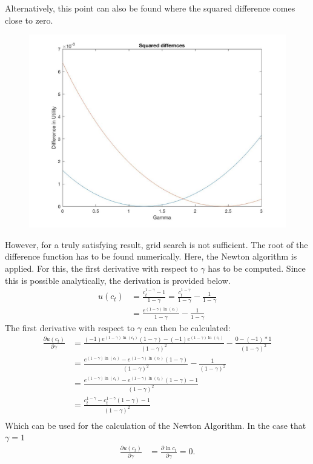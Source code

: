 \documentclass{article}
\begin{document}
Alternatively, this point can also be found where the squared difference comes close to zero. \begin{figure}[h]
\includegraphics[width = \textwidth, keepaspectratio]{PS5Q2Sub3_Squared_Diff.jpg}
\end{figure}
However, for a truly satisfying result, grid search is not sufficient. The root of the difference function has to be found numerically. Here, the Newton algorithm is applied. For this, the first derivative with respect to $\gamma$ has to be computed. Since this is possible analytically, the derivation is provided below.
\begin{align}
u(c_t) &= \frac{c_t^{1-\gamma}-1}{1- \gamma} = \frac{c_t^{1-\gamma}}{1- \gamma} -\frac{1}{1- \gamma}\\
&= \frac{e^{(1-\gamma) \ln (c_t)}}{1- \gamma} -\frac{1}{1- \gamma}
\end{align}
The first derivative with respect to $\gamma$ can then be calculated:
\begin{align}
\frac{ \partial u(c_t)}{\partial \gamma} &= \frac{(-1)e^{(1-\gamma) \ln (c_t)} (1- \gamma)- (-1)e^{(1-\gamma) \ln (c_t)}}{(1- \gamma)^2} - \frac{0 - (-1)*1}{(1- \gamma)^2} \\
&= \frac{e^{(1-\gamma) \ln (c_t)}-e^{(1-\gamma) \ln (c_t)} (1- \gamma)}{(1- \gamma)^2} - \frac{1}{(1- \gamma)^2} \\
&= \frac{e^{(1-\gamma) \ln (c_t)}-e^{(1-\gamma) \ln (c_t)} (1- \gamma)-1}{(1- \gamma)^2} \\
&= \frac{c_t^{1- \gamma}-c_t^{1- \gamma} (1- \gamma)-1}{(1- \gamma)^2} \\  
\end{align}
Which can be used for the calculation of the Newton Algorithm.
In the case that $ \gamma = 1 $
\begin{align}\frac{ \partial u(c_t)}{\partial \gamma} &= \frac{ \partial \ln c_t}{\partial \gamma} = 0.\\  
\end{align}
\end{document}
